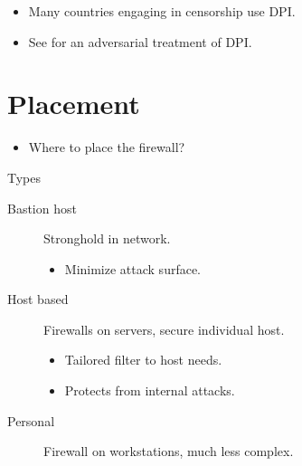 \begin{frame}
  \begin{example}
    \begin{itemize}
      \item Many countries engaging in censorship use DPI.
      \item See 
        for an adversarial treatment of DPI.
    \end{itemize}
  \end{example}
\end{frame}


\section{Placement}

\begin{frame}
  \centering

  \begin{question}
    \begin{itemize}
      \item Where to place the firewall?
    \end{itemize}
  \end{question}
\end{frame}

\begin{frame}
  \begin{block}{Types}
    \begin{description}
      \item[Bastion host] Stronghold in network.
        \begin{itemize}
          \item Minimize attack surface.
        \end{itemize}

      \item[Host based] Firewalls on servers, secure individual host.
        \begin{itemize}
          \item Tailored filter to host needs.
          \item Protects from internal attacks.
        \end{itemize}

      \item[Personal] Firewall on workstations, much less complex.
    \end{description}
  \end{block}
\end{frame}

